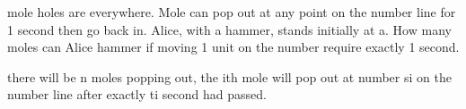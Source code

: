 mole holes are everywhere. Mole can pop out at any point on the number line for 1 second then go back in. Alice, with a hammer, stands initially at a. How many moles can Alice hammer if moving 1 unit on the number require exactly 1 second.

there will be n moles popping out, the ith mole will pop out at number si on the number line after exactly ti second had passed.
